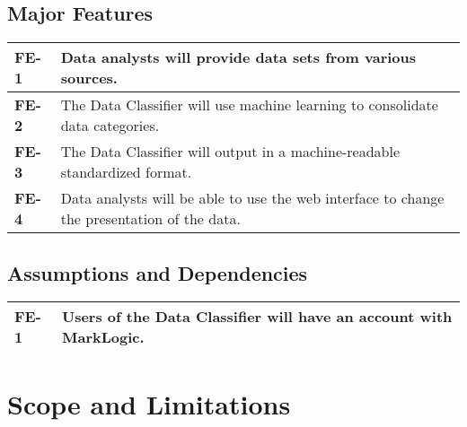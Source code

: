 \documentclass[12pt,oneside,letterpaper]{article}
\begin{document}
\subsection{Major Features}
\begin{tabular}{|p{1in}p{4.5in}|}
\hline
\textbf{FE-1}&Data analysts will provide data sets from various sources.\\
\hline
\textbf{FE-2}&The Data Classifier will use machine learning to consolidate data categories.\\
\hline
\textbf{FE-3}&The Data Classifier will output in a machine-readable standardized format.\\
\hline
\textbf{FE-4}&Data analysts will be able to use the web interface to change the presentation of the data.\\
\hline
\end{tabular}
\subsection{Assumptions and Dependencies}
\begin{tabular}{|p{1in}p{4.5in}|}
\hline
\textbf{FE-1}&Users of the Data Classifier will have an account with MarkLogic.\\
\hline
\end{tabular}



\newpage
\section{Scope and Limitations}
\end{document}
